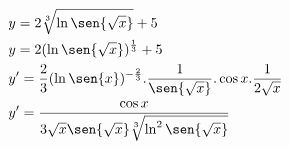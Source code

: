 \begin{ex}
\begin{align}
&y= 2\sqrt[3]{\ln{\sen{\sqrt{x}}}}+5\nonumber\\
&y=2(\ln{\sen{\sqrt{x}}})^\frac{1}{3}+5\nonumber\\
&y'=\frac{2}{3}(\ln{\sen{x}})^{-\frac{2}{3}}.\frac{1}{\sen{\sqrt{x}}}.\cos{x}.\frac{1}{2\sqrt{x}}\nonumber\\
&y'=\frac{\cos{x}}{3\sqrt{x}\sen{\sqrt{x}}\sqrt[3]{\ln^2\sen{\sqrt{x}}}}\nonumber
\end{align}
\end{ex}